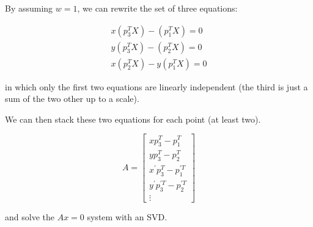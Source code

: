 By assuming $w = 1$, we can rewrite the set of three equations:

\begin{equation}
    \begin{split}
        x(p_3^TX) - (p_ 1^TX) = 0 \\
        y(p_ 3^TX) - (p_ 2^TX) = 0 \\
        x(p_2^TX) - y(p_1^TX) = 0
    \end{split}
\end{equation}

in which only the first two equations are linearly independent (the third is just a sum of the two other up to a scale).

We can then stack these two equations for each point (at least two).

\begin{equation}
    A = \left[\begin{array}{c}
        xp_3^T - p_1^T \\
        yp_3^T - p_2^T \\
        x^\prime p_3^T - p_1^{\prime T} \\
        y^\prime p_3^{\prime T} - p_2^{\prime T} \\
        \vdots
    \end{array}\right]
\end{equation}

and solve the $Ax=0$ system with an SVD.